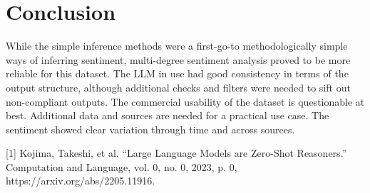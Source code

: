 \documentclass{IEEEtran}
\begin{document}
\section{Conclusion}
While the simple inference methods were a first-go-to methodologically simple ways of inferring sentiment, multi-degree sentiment analysis proved to be more reliable for this dataset. The LLM in use had good consistency in terms of the output structure, although additional checks and filters were needed to sift out non-compliant outputs. The commercial usability of the dataset is questionable at best. Additional data and sources are needed for a practical use case. The sentiment showed clear variation through time and across sources.



    [1] Kojima, Takeshi, et al. “Large Language Models are Zero-Shot Reasoners.” Computation and Language, vol. 0, no. 0, 2023, p. 0, https://arxiv.org/abs/2205.11916.
\end{document}
